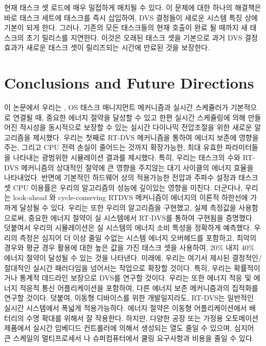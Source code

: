 \documentclass[11pt
  , a4paper
  , article
  , oneside
]{memoir}
\begin{document}
현재 태스크 셋 로드에 매우 밀접하게 매치될 수 있다. 이 문제에 대한 하나의 해결책은 바로 태스크 세트에 태스크를 즉시 삽입하여, DVS 결정들이 새로운 시스템 특징 상에 기본이 되게 한다. 그러나, 기존의 모든 태스크들의 현재 호출이 완료 될 때까지 새 태스크의 초기 릴리스를 지연한다. 이것은 오래된 태스크 셋을 기본으로 과거 DVS 결정 효과가 새로운 태스크 셋이 릴리즈되는 시간에 만료된 것을 보장한다.


	
\chapter{Conclusions and Future Directions}
이 논문에서  우리는 , OS 태스크 매니지먼트 메커니즘과 실시간 스케쥴러가 기본적으로 연결될 때, 중요한 에너지 절약을 달성할 수 있고 한편 실시간 스케쥴링에 의해 만들어진 적시성을 동시적으로 보장할 수 있는 실시간 다이나믹 전압조절을 위한 새로운 알고리즘을 제시했다. 
우리는 첫째로 RT-DVS 메커니즘을 통하여 에너지 보존에 영향을 주는, 그리고 CPU 전력 손실이 줄어드는 것까지 확장가능한, 최대 유효한 파라미터들을 나타내는 광범위한 시뮬레이션 결과를 제시했다.
특히, 우리는 태스크의 수와 RT-DVS 메커니즘의 상대적인 절약에 큰 영향을 주지않는 대기 사이클의 에너지 효율을 나타내었다.  반면에 기본적인 하드웨어 상의 적용가능한 전압과 주파수 설정과 태스크 셋 CPU 이용률은 우리의 알고리즘의 성능에 깊이있는 영향을 미친다.  
더군다나, 우리는 look-ahead 와 cycle-conseving RTDVS 메커니즘이 에너지의 이론적 하한선에 가까게 달성될 수 있다. 
우리는 또한 우리의 알고리즘을 구현했고, 실제 측정값을 사용함으로써, 중요한 에너지 절약이 실 시스템에서 RT-DVS를 통하여 구현됨을 증명했다.  
덧붙여서 우리의 시뮬레이션은 실 시스템의 에너지 소비 특성을 정확하게 예측했다. 
우리의 측정은  심지어 더 이상 줄일 수없는 시스템 에너지 오버헤드를 포함하고, 최악의 경우와 평균 경우 활용에 대한 높은 값을 가진 태스크 셋을 사용하여, 20\% 내지 40\% 에너지 절약이 달성될 수 있는 것을 나타낸다. 
미래에, 우리는 여기서 제시된 결정적인/절대적인 실시간 패러다임을 넘어서는 작업으로 확장할 것이다. 
특히, 우리는 확률적이거나 통계적 데드라인 보장으로 DVS를 연구할 것이다. 
우리는 또한 에너지 적응 및 에너지 적응적 통신 어플리케이션을 포함하여, 다른 에너지 보존 메커니즘과의 집적화를 연구할 것이다. 
덧붙여, 이동형 디바이스를 위한 개발일지라도, RT-DVS는 일반적인 실시간 시스템에서 폭넓게 적용가능하다. 
에너지 절약은 이동형 어플리케이션에서 배터리의 수명 확대를 위해서 잘 작용한다. 하지만, 다양한 공장 또는 가정용 오토메이션 제품에서 실시간 임베디드 컨트롤러에 의해서 생성되는 열도 줄일 수 있으며, 심지어 큰 스케일의 멀티프로세서 나 슈퍼컴퓨터에서 쿨링 요구사항과 비용을 줄일 수 있다. 
\end{document}
